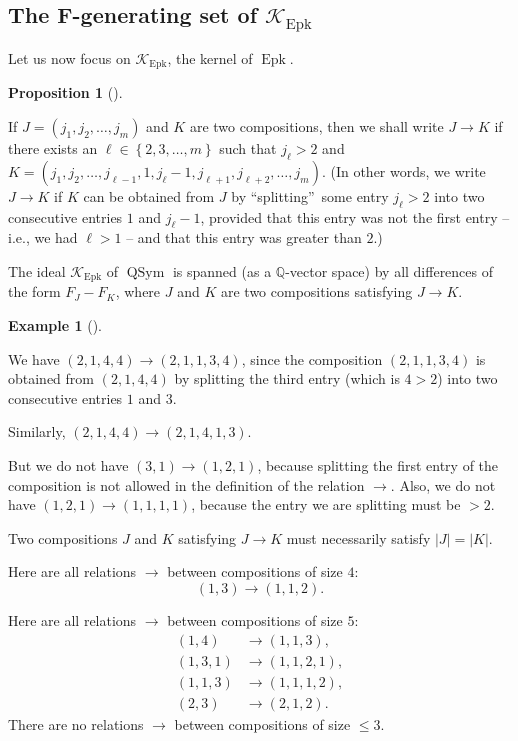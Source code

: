 \documentclass[numbers=enddot,12pt,final,onecolumn,notitlepage]{scrartcl}%
\theoremstyle{definition}
\newtheorem{prop}[theo]{Proposition}
\newenvironment{proposition}[1][]
{\begin{prop}[#1]\begin{leftbar}}
{\end{leftbar}\end{prop}}
\newtheorem{exmp}[theo]{Example}
\newenvironment{example}[1][]
{\begin{exmp}[#1]\begin{leftbar}}
{\end{leftbar}\end{exmp}}
\begin{document}
\subsection{The F-generating set of $\mathcal{K}_{\operatorname*{Epk}}$}

Let us now focus on $\mathcal{K}_{\operatorname*{Epk}}$, the kernel of
$\operatorname*{Epk}$.

\begin{proposition}
\label{prop.K.Epk.F}If $J=\left(  j_{1},j_{2},\ldots,j_{m}\right)  $ and $K$
are two compositions, then we shall write $J\rightarrow K$ if there exists an
$\ell\in\left\{  2,3,\ldots,m\right\}  $ such that $j_{\ell}>2$ and $K=\left(
j_{1},j_{2},\ldots,j_{\ell-1},1,j_{\ell}-1,j_{\ell+1},j_{\ell+2},\ldots
,j_{m}\right)  $. (In other words, we write $J\rightarrow K$ if $K$ can be
obtained from $J$ by \textquotedblleft splitting\textquotedblright\ some entry
$j_{\ell}>2$ into two consecutive entries $1$ and $j_{\ell}-1$, provided that
this entry was not the first entry -- i.e., we had $\ell>1$ -- and that this
entry was greater than $2$.)

The ideal $\mathcal{K}_{\operatorname*{Epk}}$ of $\operatorname*{QSym}$ is
spanned (as a $\mathbb{Q}$-vector space) by all differences of the form
$F_{J}-F_{K}$, where $J$ and $K$ are two compositions satisfying $J\rightarrow
K$.
\end{proposition}

\begin{example}
We have $\left(  2,1,4,4\right)  \rightarrow\left(  2,1,1,3,4\right)  $, since
the composition $\left(  2,1,1,3,4\right)  $ is obtained from $\left(
2,1,4,4\right)  $ by splitting the third entry (which is $4>2$) into two
consecutive entries $1$ and $3$.

Similarly, $\left(  2,1,4,4\right)  \rightarrow\left(  2,1,4,1,3\right)  $.

But we do not have $\left(  3,1\right)  \rightarrow\left(  1,2,1\right)  $,
because splitting the first entry of the composition is not allowed in the
definition of the relation $\rightarrow$. Also, we do not have $\left(
1,2,1\right)  \rightarrow\left(  1,1,1,1\right)  $, because the entry we are
splitting must be $>2$.

Two compositions $J$ and $K$ satisfying $J\rightarrow K$ must necessarily
satisfy $\left\vert J\right\vert =\left\vert K\right\vert $.

Here are all relations $\rightarrow$ between compositions of size $4$:%
\[
\left(  1,3\right)  \rightarrow\left(  1,1,2\right)  .
\]


Here are all relations $\rightarrow$ between compositions of size $5$:%
\begin{align*}
\left(  1,4\right)   &  \rightarrow\left(  1,1,3\right)  ,\\
\left(  1,3,1\right)   &  \rightarrow\left(  1,1,2,1\right)  ,\\
\left(  1,1,3\right)   &  \rightarrow\left(  1,1,1,2\right)  ,\\
\left(  2,3\right)   &  \rightarrow\left(  2,1,2\right)  .
\end{align*}
There are no relations $\rightarrow$ between compositions of size $\leq3$.
\end{example}
\end{document}
